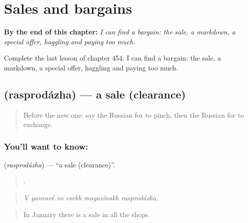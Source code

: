 
\chapter{Sales and bargains}
\label{ch:ru-sales-and-bargains}

\begin{chapteropening}
\textbf{By the end of this chapter:} \emph{I can find a bargain: the sale, a markdown, a special offer, haggling and paying too much.}

Complete the last lesson of chapter 454: I can find a bargain: the sale, a markdown, a special offer, haggling and paying too much.
\end{chapteropening}

\section[\texorpdfstring{\ru{распродажа} (rasprodázha)}{распродажа (rasprodázha)}]{ (rasprodázha) — a sale (clearance)}

\label{lesson:RU-C454-rasprodazha}



\begin{quote}
Before the new one: say the Russian for to pinch, then the Russian for to exchange.
\end{quote}

\subsection*{You'll want to know: }
\textbf{} (\emph{rasprodázha}) — \textquotedblleft{}a sale (clearance)\textquotedblright{}.

\begin{quote}
     .
\end{quote}

\begin{quote}
\emph{V yanvaré vo vsekh magazínakh rasprodázha.}
\end{quote}

\begin{quote}
In January there is a sale in all the shops.
\end{quote}

